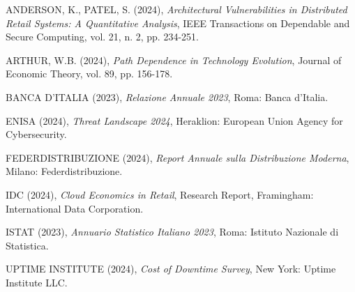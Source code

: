 \begingroup
\renewcommand{\section}[2]{}
\begin{thebibliography}{99}

 ANDERSON, K., PATEL, S. (2024), \textit{Architectural Vulnerabilities in Distributed Retail Systems: A Quantitative Analysis}, IEEE Transactions on Dependable and Secure Computing, vol. 21, n. 2, pp. 234-251.

 ARTHUR, W.B. (2024), \textit{Path Dependence in Technology Evolution}, Journal of Economic Theory, vol. 89, pp. 156-178.

 BANCA D'ITALIA (2023), \textit{Relazione Annuale 2023}, Roma: Banca d'Italia.

 ENISA (2024), \textit{Threat Landscape 2024}, Heraklion: European Union Agency for Cybersecurity.

 FEDERDISTRIBUZIONE (2024), \textit{Report Annuale sulla Distribuzione Moderna}, Milano: Federdistribuzione.

 IDC (2024), \textit{Cloud Economics in Retail}, Research Report, Framingham: International Data Corporation.

 ISTAT (2023), \textit{Annuario Statistico Italiano 2023}, Roma: Istituto Nazionale di Statistica.

 UPTIME INSTITUTE (2024), \textit{Cost of Downtime Survey}, New York: Uptime Institute LLC.

\end{thebibliography}
\endgroup